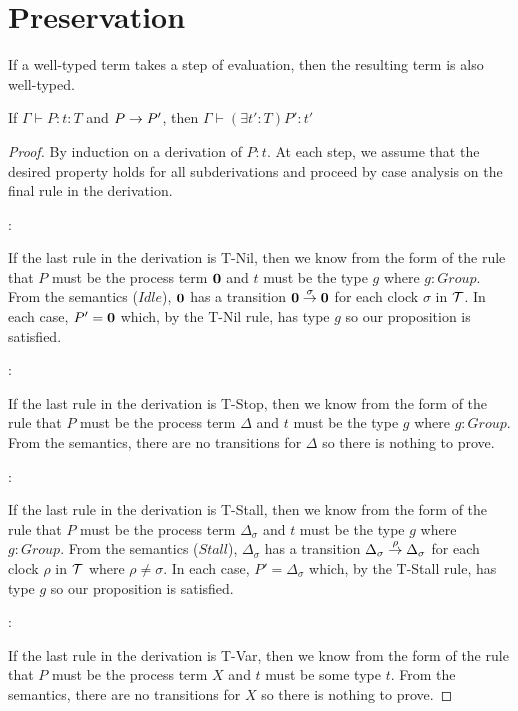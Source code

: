 \chapter{Preservation}

If a well-typed term takes a step of evaluation, then the resulting
term is also well-typed.

\begin{theorem}
If $\Gamma \vdash P : t : T$ and $P \stackrel{}{\rightarrow} P'$, then $\Gamma \vdash (\exists t' : T) P' : t'$
\end{theorem}

\begin{proof}
By induction on a derivation of $P:t$.  At each step, we assume that
the desired property holds for all subderivations and proceed by case
analysis on the final rule in the derivation.

:

\noindent If the last rule in the derivation is T-Nil, then we know
from the form of the rule that $P$ must be the process term $\textbf{0}$ and
$t$ must be the type $g$ where $g : Group$.  From the semantics
($Idle$), $\textbf{0}$ has a transition $\textbf{0} \stackrel{\sigma}{\rightarrow} \textbf{0}$ for
each clock $\sigma$ in $\text{$\mathcal{T}$}$.  In each case, $P' = \textbf{0}$ which, by
the T-Nil rule, has type $g$ so our proposition is satisfied.

:

\noindent If the last rule in the derivation is T-Stop, then we know
from the form of the rule that $P$ must be the process term $\Delta$
and $t$ must be the type $g$ where $g : Group$.  From the semantics,
there are no transitions for $\Delta$ so there is nothing to prove.

:

\noindent If the last rule in the derivation is T-Stall, then we know
from the form of the rule that $P$ must be the process term
$\Delta_\sigma$ and $t$ must be the type $g$ where $g : Group$.  From
the semantics ($Stall$), $\Delta_\sigma$ has a transition
$\Delta_\sigma \stackrel{\rho}{\rightarrow} \Delta_\sigma$ for each clock $\rho$ in
$\text{$\mathcal{T}$}$ where $\rho \ne \sigma$.  In each case, $P' = \Delta_\sigma$
which, by the T-Stall rule, has type $g$ so our proposition is
satisfied.

:

\noindent If the last rule in the derivation is T-Var, then we know
from the form of the rule that $P$ must be the process term $X$ and
$t$ must be some type $t$.  From the semantics, there are no
transitions for $X$ so there is nothing to prove.


\end{proof}
